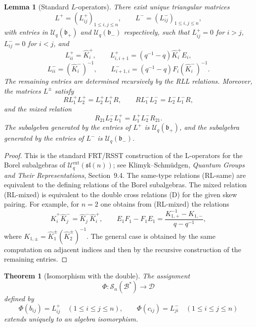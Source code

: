 \documentclass{article}
\newtheorem{theorem}{Theorem}
\newtheorem{lemma}{Lemma}
\theoremstyle{definition}
\newcommand{\Uc}{\mathcal{U}}
\newcommand{\bcS}{\mathcal{S}}
\newcommand{\fB}{\mathcal{B}}
\newcommand{\fD}{\mathcal{D}}
\newcommand{\Khat}{\widehat K}
\newcommand{\q}{q}
\begin{document}
\begin{lemma}[Standard $L$-operators]\label{lem:L}
There exist unique triangular matrices
\[
L^+=(L^+_{ij})_{1\leq i,j\leq n},\qquad
L^-=(L^-_{ij})_{1\leq i,j\leq n},
\]
with entries in $\Uc_q(\mathfrak{b}_+)$ and $\Uc_q(\mathfrak{b}_-)$
respectively, such that $L^+_{ij}=0$ for $i>j$, $L^-_{ij}=0$ for
$i<j$, and
\[
L^+_{ii}=\Khat_i^+,\qquad
L^+_{i,i+1}=(\q^{-1}-\q)\Khat_i^+ E_i,
\]
\[
L^-_{ii}=(\Khat_i^-)^{-1},\qquad
L^-_{i+1,i}=(\q^{-1}-\q)F_i(\Khat_i^-)^{-1}.
\]
The remaining entries are determined recursively by the RLL relations.
Moreover, the matrices $L^\pm$ satisfy
\begin{equation}
  R L^+_1 L^+_2 = L^+_2 L^+_1 R,\qquad
  R L^-_1 L^-_2 = L^-_2 L^-_1 R,
  \tag{RL-same}
\end{equation}
and the mixed relation
\begin{equation}
  R_{21} L^-_2 L^+_1 = L^+_1 L^-_2 R_{21}.
  \tag{RL-mixed}
\end{equation}
The subalgebra generated by the entries of $L^+$ is
$\Uc_q(\mathfrak{b}_+)$, and the subalgebra generated by the entries
of $L^-$ is $\Uc_q(\mathfrak{b}_-)$.
\end{lemma}

\begin{proof}
This is the standard FRT/RSST construction of the L-operators for the
Borel subalgebras of $\Uc_q^{\mathrm{ext}}(\mathfrak{sl}(n))$; see
Klimyk--Schm\"udgen, {\em Quantum Groups and Their Representations},
Section~9.4. The same-type relations (RL-same) are equivalent to the
defining relations of the Borel subalgebras. The mixed relation
(RL-mixed) is equivalent to the double cross relations (D) for the
given skew pairing. For example, for $n=2$ one obtains from
(RL-mixed) the relations
\[
\Khat_i^+\Khat_j^-=\Khat_j^-\Khat_i^+,
\qquad
E_1F_1-F_1E_1
=\frac{K_{1,+}^{-1}-K_{1,-}}{\q-\q^{-1}},
\]
where $K_{1,\pm}=\Khat_1^\pm(\Khat_2^\pm)^{-1}$. The general case is
obtained by the same computation on adjacent indices and then by the
recursive construction of the remaining entries. 
\end{proof}

\begin{theorem}[Isomorphism with the double]\label{thm:double}
The assignment
\[
\Phi:\bcS_n(\fB^*)\longrightarrow \fD
\]
defined by
\[
\Phi(b_{ij})=L^+_{ij}\quad (1\leq i\leq j\leq n),
\qquad
\Phi(c_{ij})=L^-_{ji}\quad (1\leq i\leq j\leq n)
\]
extends uniquely to an algebra isomorphism.
\end{theorem}
\end{document}
